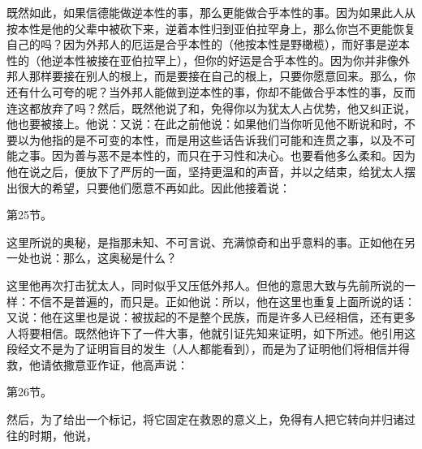 既然如此，如果信德能做逆本性的事，那么更能做合乎本性的事。因为如果此人从按本性是他的父辈中被砍下来，逆着本性归到亚伯拉罕身上，那么你岂不更能恢复自己的吗？因为外邦人的厄运是合乎本性的（他按本性是野橄榄），而好事是逆本性的（他逆本性被接在亚伯拉罕上），但你的好运是合乎本性的。因为你并非像外邦人那样要接在别人的根上，而是要接在自己的根上，只要你愿意回来。那么，你还有什么可夸的呢？当外邦人能做到逆本性的事，你却不能做合乎本性的事，反而连这都放弃了吗？然后，既然他说了和，免得你以为犹太人占优势，他又纠正说，他也要被接上。他说：又说：在此之前他说：如果他们当你听见他不断说和时，不要以为他指的是不可变的本性，而是用这些话告诉我们可能和连贯之事，以及不可能之事。因为善与恶不是本性的，而只在于习性和决心。也要看他多么柔和。因为他在说之后，便放下了严厉的一面，坚持更温和的声音，并以之结束，给犹太人摆出很大的希望，只要他们愿意不再如此。因此他接着说：\par

第25节。\par

这里所说的奥秘，是指那未知、不可言说、充满惊奇和出乎意料的事。正如他在另一处也说：那么，这奥秘是什么？\par

这里他再次打击犹太人，同时似乎又压低外邦人。但他的意思大致与先前所说的一样：不信不是普遍的，而只是。正如他说：所以，他在这里也重复上面所说的话：又说：他在这里也是说：被拔起的不是整个民族，而是许多人已经相信，还有更多人将要相信。既然他许下了一件大事，他就引证先知来证明，如下所述。他引用这段经文不是为了证明盲目的发生（人人都能看到），而是为了证明他们将相信并得救，他请依撒意亚作证，他高声说：\par

第26节。\par

然后，为了给出一个标记，将它固定在救恩的意义上，免得有人把它转向并归诸过往的时期，他说，\par

